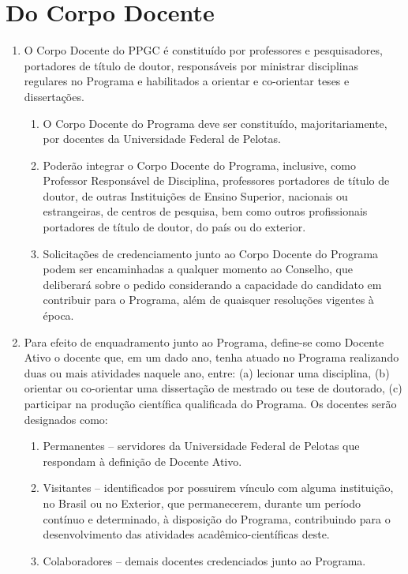 \documentclass{article}
\newcommand{\grupoMaior}{Conselho\xspace}
\begin{document}
\section{Do Corpo Docente}

\begin{enumerate}
	\item O Corpo Docente do PPGC é constituído por professores e pesquisadores, portadores de título de doutor, responsáveis por ministrar disciplinas regulares no Programa e habilitados a orientar e co-orientar teses e dissertações.

	\begin{enumerate}
		\item O Corpo Docente do Programa deve ser constituído, majoritariamente, por docentes da Universidade Federal de Pelotas.

		\item Poderão integrar o Corpo Docente do Programa, inclusive, como Professor Responsável de Disciplina, professores portadores de título de doutor, de outras Instituições de Ensino Superior, nacionais ou estrangeiras, de centros de pesquisa, bem como outros profissionais portadores de título de doutor, do país ou do exterior.

		\item Solicitações de credenciamento junto ao Corpo Docente do Programa podem ser encaminhadas a qualquer momento ao \grupoMaior, que deliberará sobre o pedido considerando a capacidade do candidato em contribuir para o Programa, além de quaisquer resoluções vigentes à época.
	\end{enumerate}

	\item Para efeito de enquadramento junto ao Programa, define-se como Docente Ativo o docente que, em um dado ano, tenha atuado no Programa realizando duas ou mais atividades naquele ano, entre: (a) lecionar uma disciplina, (b) orientar ou co-orientar uma dissertação de mestrado ou tese de doutorado, (c) participar na produção científica qualificada do Programa. Os docentes serão designados como:

	\begin{enumerate}[label=\Roman*]

		\item Permanentes – servidores da Universidade Federal de Pelotas que respondam à definição de Docente Ativo.

		\item Visitantes – identificados por possuirem vínculo com alguma instituição, no Brasil ou no Exterior, que permanecerem, durante um período contínuo e determinado, à disposição do Programa, contribuindo para o desenvolvimento das atividades acadêmico-científicas deste.		
		\item Colaboradores – demais docentes credenciados junto ao Programa.


\end{enumerate}
\end{enumerate}
\end{document}

